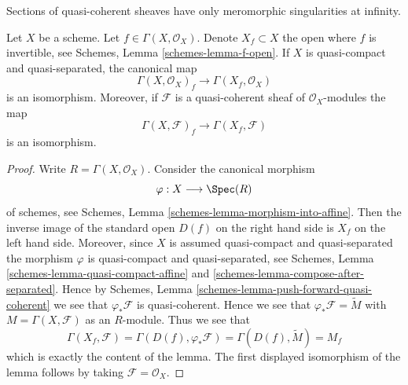 \begin{lemma}
\label{lemma-invert-f-sections}
\begin{slogan}
Sections of quasi-coherent sheaves have only meromorphic singularities
at infinity.
\end{slogan}
Let $X$ be a scheme. Let $f \in \Gamma(X, \mathcal{O}_X)$.
Denote $X_f \subset X$ the open where $f$ is invertible, see
Schemes, Lemma \ref{schemes-lemma-f-open}.
If $X$ is quasi-compact and quasi-separated, the canonical map
$$
\Gamma(X, \mathcal{O}_X)_f \longrightarrow \Gamma(X_f, \mathcal{O}_X)
$$
is an isomorphism. Moreover, if $\mathcal{F}$ is a quasi-coherent
sheaf of $\mathcal{O}_X$-modules the map
$$
\Gamma(X, \mathcal{F})_f \longrightarrow \Gamma(X_f, \mathcal{F})
$$
is an isomorphism.
\end{lemma}

\begin{proof}
Write $R = \Gamma(X, \mathcal{O}_X)$. Consider the canonical morphism
$$
\varphi : X \longrightarrow \Spec(R)
$$
of schemes, see
Schemes, Lemma
\ref{schemes-lemma-morphism-into-affine}.
Then the inverse image of the standard open $D(f)$ on the
right hand side is $X_f$ on the left hand side.
Moreover, since $X$ is assumed quasi-compact and quasi-separated
the morphism $\varphi$ is quasi-compact and quasi-separated,
see Schemes, Lemma \ref{schemes-lemma-quasi-compact-affine} and
\ref{schemes-lemma-compose-after-separated}. Hence by
Schemes, Lemma \ref{schemes-lemma-push-forward-quasi-coherent}
we see that $\varphi_*\mathcal{F}$ is quasi-coherent.
Hence we see that $\varphi_*\mathcal{F} = \widetilde M$
with $M = \Gamma(X, \mathcal{F})$ as an $R$-module.
Thus we see that
$$
\Gamma(X_f, \mathcal{F}) =
\Gamma(D(f), \varphi_*\mathcal{F}) =
\Gamma(D(f), \widetilde M) = M_f
$$
which is exactly the content of the lemma. The first displayed isomorphism
of the lemma follows by taking $\mathcal{F} = \mathcal{O}_X$.
\end{proof}
